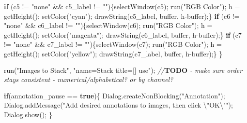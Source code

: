 \documentclass[
  12pt,
  a4paper,
]{book}
\newenvironment{Shaded}{}{}
\newcommand{\AlertTok}[1]{\textcolor[rgb]{1.00,0.00,0.00}{\textbf{#1}}}
\newcommand{\CommentTok}[1]{\textcolor[rgb]{0.38,0.63,0.69}{\textit{#1}}}
\newcommand{\ControlFlowTok}[1]{\textcolor[rgb]{0.00,0.44,0.13}{\textbf{#1}}}
\newcommand{\KeywordTok}[1]{\textcolor[rgb]{0.00,0.44,0.13}{\textbf{#1}}}
\newcommand{\NormalTok}[1]{#1}
\newcommand{\OperatorTok}[1]{\textcolor[rgb]{0.40,0.40,0.40}{#1}}
\newcommand{\SpecialCharTok}[1]{\textcolor[rgb]{0.25,0.44,0.63}{#1}}
\newcommand{\StringTok}[1]{\textcolor[rgb]{0.25,0.44,0.63}{#1}}
\begin{document}
\begin{Shaded}
\begin{Highlighting}[]
    \ControlFlowTok{if} \OperatorTok{(}\NormalTok{c5 }\OperatorTok{!=} \StringTok{"none"} \OperatorTok{\&\&}\NormalTok{ c5\_label }\OperatorTok{!=} \StringTok{""}\OperatorTok{)\{}\NormalTok{selectWindow}\OperatorTok{(}\NormalTok{c5}\OperatorTok{);}\NormalTok{ run}\OperatorTok{(}\StringTok{"RGB Color"}\OperatorTok{);}\NormalTok{ h }\OperatorTok{=}\NormalTok{ getHeight}\OperatorTok{();}\NormalTok{ setColor}\OperatorTok{(}\StringTok{"cyan"}\OperatorTok{);}\NormalTok{ drawString}\OperatorTok{(}\NormalTok{c5\_label}\OperatorTok{,}\NormalTok{ buffer}\OperatorTok{,}\NormalTok{ h}\OperatorTok{{-}}\NormalTok{buffer}\OperatorTok{);\}}
    \ControlFlowTok{if} \OperatorTok{(}\NormalTok{c6 }\OperatorTok{!=} \StringTok{"none"} \OperatorTok{\&\&}\NormalTok{ c6\_label }\OperatorTok{!=} \StringTok{""}\OperatorTok{)\{}\NormalTok{selectWindow}\OperatorTok{(}\NormalTok{c6}\OperatorTok{);}\NormalTok{ run}\OperatorTok{(}\StringTok{"RGB Color"}\OperatorTok{);}\NormalTok{ h }\OperatorTok{=}\NormalTok{ getHeight}\OperatorTok{();}\NormalTok{ setColor}\OperatorTok{(}\StringTok{"magenta"}\OperatorTok{);}\NormalTok{ drawString}\OperatorTok{(}\NormalTok{c6\_label}\OperatorTok{,}\NormalTok{ buffer}\OperatorTok{,}\NormalTok{ h}\OperatorTok{{-}}\NormalTok{buffer}\OperatorTok{);\}}
    \ControlFlowTok{if} \OperatorTok{(}\NormalTok{c7 }\OperatorTok{!=} \StringTok{"none"} \OperatorTok{\&\&}\NormalTok{ c7\_label }\OperatorTok{!=} \StringTok{""}\OperatorTok{)\{}\NormalTok{selectWindow}\OperatorTok{(}\NormalTok{c7}\OperatorTok{);}\NormalTok{ run}\OperatorTok{(}\StringTok{"RGB Color"}\OperatorTok{);}\NormalTok{ h }\OperatorTok{=}\NormalTok{ getHeight}\OperatorTok{();}\NormalTok{ setColor}\OperatorTok{(}\StringTok{"yellow"}\OperatorTok{);}\NormalTok{ drawString}\OperatorTok{(}\NormalTok{c7\_label}\OperatorTok{,}\NormalTok{ buffer}\OperatorTok{,}\NormalTok{ h}\OperatorTok{{-}}\NormalTok{buffer}\OperatorTok{);\}}
\OperatorTok{\}}


\NormalTok{run}\OperatorTok{(}\StringTok{"Images to Stack"}\OperatorTok{,} \StringTok{"name=Stack title=[] use"}\OperatorTok{);}
\CommentTok{//}\AlertTok{TODO}\CommentTok{ {-} make sure order stays consistent {-} numerical/alphabetical? or by channel?}

\ControlFlowTok{if}\OperatorTok{(}\NormalTok{annotation\_pause }\OperatorTok{==} \KeywordTok{true}\OperatorTok{)\{}
\NormalTok{    Dialog}\OperatorTok{.}\NormalTok{createNonBlocking}\OperatorTok{(}\StringTok{"Annotation"}\OperatorTok{);}
\NormalTok{    Dialog}\OperatorTok{.}\NormalTok{addMessage}\OperatorTok{(}\StringTok{"Add desired annotations to images, then click }\SpecialCharTok{\textbackslash{}"}\StringTok{OK}\SpecialCharTok{\textbackslash{}"}\StringTok{"}\OperatorTok{);}
\NormalTok{    Dialog}\OperatorTok{.}\NormalTok{show}\OperatorTok{();}
\OperatorTok{\}}


\end{Highlighting}
\end{Shaded}
\end{document}
